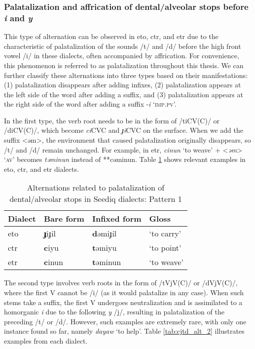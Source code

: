 \subsubsection{Palatalization and affrication of dental/alveolar stops before \textit{i} and \textit{y}}

This type of alternation can be observed in \acl{eto}, \acl{ctr}, and \acl{etr} due to the characteristic of palatalization of the sounds /t/ and /d/ before the high front vowel /i/ in these dialects, often accompanied by affrication. For convenience, this phenomenon is referred to as palatalization throughout this thesis. We can further classify these alternations into three types based on their manifestations: (1) palatalization disappears after adding infixes, (2) palatalization appears at the left side of the word after adding a suffix, and (3) palatalization appears at the right side of the word after adding a suffix -\textit{i} `\textsc{imp.pv}'.

In the first type, the verb root needs to be in the form of /tiCV(C)/ or /diCV(C)/, which become \textit{ci}CVC and \textit{ɟi}CVC on the surface. When we add the suffix <əm>, the environment that caused palatalization originally disappears, so /t/ and /d/ remain unchanged. For example, in \acl{etr}, \textit{cinun} `to weave' + <\textit{əm}> `\textsc{av}' becomes \textit{təminun} instead of **cəminun. Table \ref{tab:cjtd_alt_1} shows relevant examples in \acl{eto}, \acl{ctr}, and \acl{etr} dialects. 

\begin{table}[!htbp]
\centering
\caption{Alternations related to palatalization of dental/alveolar stops in Seediq dialects: Pattern 1}
\label{tab:cjtd_alt_1}
\begin{tabular}{llll}
\hline
Dialect   & Bare form & Infixed form & Gloss      \\ \hline
\acl{eto} & \textbf{ɟ}iɟil     & \textbf{d}əmiɟil      & `to carry' \\
\acl{ctr} & \textbf{c}iyu      & \textbf{t}əmiyu       & `to point' \\
\acl{etr} & \textbf{c}inun     & \textbf{t}əminun      & `to weave' \\ \hline
\end{tabular}
\end{table}

The second type involves verb roots in the form of /tVjV(C)/ or /dVjV(C)/, where the first V cannot be /i/ (as it would palatalize in any case). When such stems take a suffix, the first V undergoes neutralization and is assimilated to a homorganic \textit{i} due to the following \textit{y} /j/, resulting in palatalization of the preceding /t/ or /d/. However, such examples are extremely rare, with only one instance found so far, namely \textit{dayaw} `to help'. Table \ref{tab:cjtd_alt_2} illustrates examples from each dialect.

